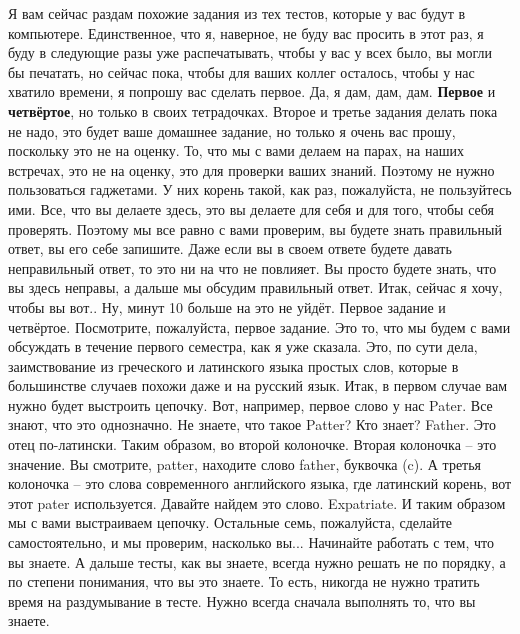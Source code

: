 \documentclass[main.tex]{subfiles}
\begin{document}
\newpage
{}

Я вам сейчас раздам похожие задания из тех тестов, которые у вас будут в компьютере.
Единственное, что я, наверное, не буду вас просить в этот раз, я буду в следующие разы уже распечатывать, чтобы у вас у всех было, вы могли бы печатать, но сейчас пока, чтобы для ваших коллег осталось, чтобы у нас хватило времени, я попрошу вас сделать первое.
Да, я дам, дам, дам.
\textbf{Первое} и \textbf{четвёртое}, но только в своих тетрадочках.
Второе и третье задания делать пока не надо, это будет ваше домашнее задание, но только я очень вас прошу, поскольку это не на оценку.
То, что мы с вами делаем на парах, на наших встречах, это не на оценку, это для проверки ваших знаний.
Поэтому не нужно пользоваться гаджетами.
У них корень такой, как раз, пожалуйста, не пользуйтесь ими.
Все, что вы делаете здесь, это вы делаете для себя и для того, чтобы себя проверять.
Поэтому мы все равно с вами проверим, вы будете знать правильный ответ, вы его себе запишите.
Даже если вы в своем ответе будете давать неправильный ответ, то это ни на что не повлияет.
Вы просто будете знать, что вы здесь неправы, а дальше мы обсудим правильный ответ.
Итак, сейчас я хочу, чтобы вы вот..
Ну, минут 10 больше на это не уйдёт.
Первое задание и четвёртое.
Посмотрите, пожалуйста, первое задание.
Это то, что мы будем с вами обсуждать в течение первого семестра, как я уже сказала.
Это, по сути дела, заимствование из греческого и латинского языка простых слов, которые в большинстве случаев похожи даже и на русский язык.
Итак, в первом случае вам нужно будет выстроить цепочку.
Вот, например, первое слово у нас Pater.
Все знают, что это однозначно.
Не знаете, что такое Patter? Кто знает? Father.
Это отец по-латински.
Таким образом, во второй колоночке.
Вторая колоночка -- это значение.
Вы смотрите, patter, находите слово father, буквочка (c).
А третья колоночка -- это слова современного английского языка, где латинский корень, вот этот pater используется.
Давайте найдем это слово.
Expatriate.
И таким образом мы с вами выстраиваем цепочку.
Остальные семь, пожалуйста, сделайте самостоятельно, и мы проверим, насколько вы...
Начинайте работать с тем, что вы знаете.
А дальше тесты, как вы знаете, всегда нужно решать не по порядку, а по степени понимания, что вы это знаете.
То есть, никогда не нужно тратить время на раздумывание в тесте.
Нужно всегда сначала выполнять то, что вы знаете.

\newpage
{}
\end{document}
